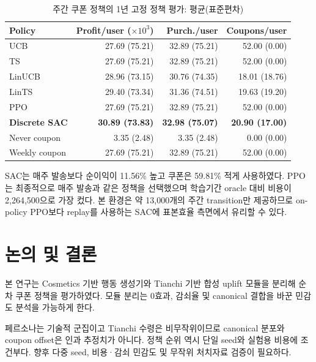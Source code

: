 \documentclass[9pt,twocolumn]{extarticle}
\begin{document}
\begin{table}[t]
\centering
\caption{주간 쿠폰 정책의 1년 고정 정책 평가: 평균(표준편차)}
\label{tab:policy}
\small
\setlength{\tabcolsep}{2pt}
\begin{tabular*}{\columnwidth}{@{\extracolsep{\fill}}lrrr@{}}
\toprule
Policy & Profit/user ($\times10^3$) & Purch./user & Coupons/user\\
\midrule
UCB & 27.69 (75.21) & 32.89 (75.21) & 52.00 (0.00)\\
TS & 27.69 (75.21) & 32.89 (75.21) & 52.00 (0.00)\\
LinUCB & 28.96 (73.15) & 30.76 (74.35) & 18.01 (18.76)\\
LinTS & 29.40 (73.34) & 31.36 (74.51) & 19.63 (19.20)\\
PPO & 27.69 (75.21) & 32.89 (75.21) & 52.00 (0.00)\\
\textbf{Discrete SAC} & \textbf{30.89 (73.83)} & \textbf{32.98 (75.07)} & \textbf{20.90 (17.00)}\\
Never coupon & 3.35 (2.48) & 3.35 (2.48) & 0.00 (0.00)\\
Weekly coupon & 27.69 (75.21) & 32.89 (75.21) & 52.00 (0.00)\\
\bottomrule
\end{tabular*}
\end{table}

SAC는 매주 발송보다 순이익이 11.56\% 높고 쿠폰은 59.81\% 적게 사용하였다.
PPO는 최종적으로 매주 발송과 같은 정책을 선택했으며 학습기간 oracle 대비 비용이
2,264,500으로 가장 컸다. 본 환경은 약 13,000개의 주간 transition만 제공하므로
on-policy PPO보다 replay를 사용하는 SAC에 표본효율 측면에서 유리할 수 있다.

\section{논의 및 결론}
본 연구는 Cosmetics 기반 행동 생성기와 Tianchi 기반 합성 uplift 모듈을 분리해
순차 쿠폰 정책을 평가하였다. 모듈 분리는 0효과, 감쇠율 및 canonical 결합을 바꾼
민감도 분석을 가능하게 한다.

페르소나는 기술적 군집이고 Tianchi 수령은 비무작위이므로 canonical 분포와 coupon
offset은 인과 추정치가 아니다. 정책 순위 역시 단일 seed와 실험용 비용에 조건부다.
향후 다중 seed, 비용·감쇠 민감도 및 무작위 처치자료 검증이 필요하다.
\end{document}
